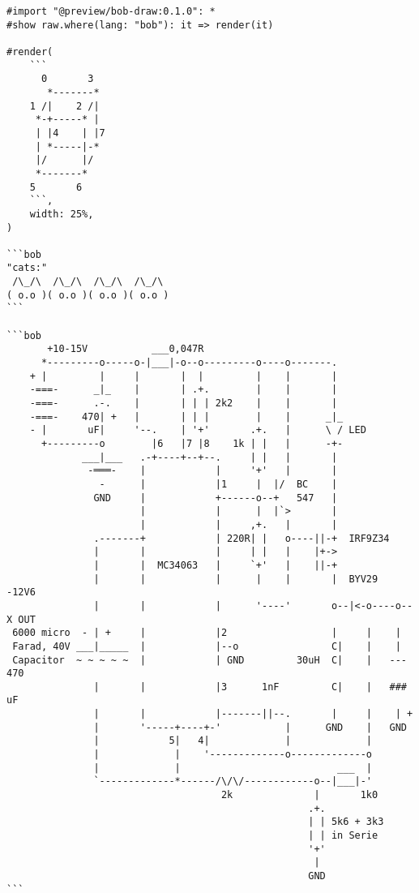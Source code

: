 \begin{verbatim}
#import "@preview/bob-draw:0.1.0": *
#show raw.where(lang: "bob"): it => render(it)

#render(
    ```
      0       3  
       *-------* 
    1 /|    2 /| 
     *-+-----* | 
     | |4    | |7
     | *-----|-*
     |/      |/
     *-------*
    5       6
    ```,
    width: 25%,
)

```bob
"cats:"
 /\_/\  /\_/\  /\_/\  /\_/\ 
( o.o )( o.o )( o.o )( o.o )
```

```bob
       +10-15V           ___0,047R
      *---------o-----o-|___|-o--o---------o----o-------.
    + |         |     |       |  |         |    |       |
    -===-      _|_    |       | .+.        |    |       |
    -===-      .-.    |       | | | 2k2    |    |       |
    -===-    470| +   |       | | |        |    |      _|_
    - |       uF|     '--.    | '+'       .+.   |      \ / LED
      +---------o        |6   |7 |8    1k | |   |      -+-
             ___|___   .-+----+--+--.     | |   |       |
              -═══-    |            |     '+'   |       |
                -      |            |1     |  |/  BC    |
               GND     |            +------o--+   547   |
                       |            |      |  |`>       |
                       |            |     ,+.   |       |
               .-------+            | 220R| |   o----||-+  IRF9Z34
               |       |            |     | |   |    |+->
               |       |  MC34063   |     `+'   |    ||-+
               |       |            |      |    |       |  BYV29     -12V6
               |       |            |      '----'       o--|<-o----o--X OUT
 6000 micro  - | +     |            |2                  |     |    |
 Farad, 40V ___|_____  |            |--o                C|    |    |
 Capacitor  ~ ~ ~ ~ ~  |            | GND         30uH  C|    |   --- 470
               |       |            |3      1nF         C|    |   ###  uF
               |       |            |-------||--.       |     |    | +
               |       '-----+----+-'           |      GND    |   GND
               |            5|   4|             |             |
               |             |    '-------------o-------------o
               |             |                           ___  |
               `-------------*------/\/\/------------o--|___|-'
                                     2k              |       1k0
                                                    .+.
                                                    | | 5k6 + 3k3
                                                    | | in Serie
                                                    '+'
                                                     |
                                                    GND
```
\end{verbatim}


